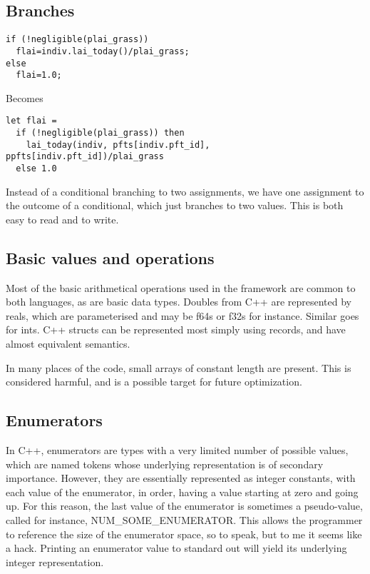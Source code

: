 \subsection{Branches}
\begin{verbatim}
if (!negligible(plai_grass))
  flai=indiv.lai_today()/plai_grass;
else
  flai=1.0;
\end{verbatim}

Becomes

\begin{verbatim}
let flai =
  if (!negligible(plai_grass)) then
    lai_today(indiv, pfts[indiv.pft_id], ppfts[indiv.pft_id])/plai_grass
  else 1.0
\end{verbatim}
Instead of a conditional branching to two assignments, we have one assignment to the outcome of a conditional, which just branches to two values. This is both easy to read and to write.

\subsection{Basic values and operations}
Most of the basic arithmetical operations used in the framework are common to both languages, as are basic data types. Doubles from C++ are represented by reals, which are parameterised and may be f64s or f32s for instance. Similar goes for ints. C++ structs can be represented most simply using records, and have almost equivalent semantics.

In many places of the code, small arrays of constant length are present. This is considered harmful\cite{smallarraysbad}, and is a possible target for future optimization.

\subsection{Enumerators}
In C++, enumerators are types with a very limited number of possible values, which are named tokens whose underlying representation is of secondary importance. However, they are essentially represented as integer constants, with each value of the enumerator, in order, having a value starting at zero and going up. For this reason, the last value of the enumerator is sometimes a pseudo-value, called for instance, NUM_SOME_ENUMERATOR. This allows the programmer to reference the size of the enumerator space, so to speak, but to me it seems like a hack. Printing an enumerator value to standard out will yield its underlying integer representation.

